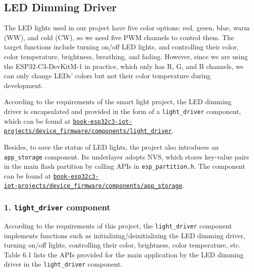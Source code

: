 \documentclass[a4paper,12pt]{book}
\begin{document}
\subsection{LED Dimming Driver}
The LED lights used in our project have five color options: red, green, blue, warm (WW), and cold (CW), so we need five PWM channels to control them. The target functions include turning on/off LED lights, and controlling their color, color temperature, brightness, breathing, and fading. However, since we are using the ESP32-C3-DevKitM-1 in practice, which only has R, G, and B channels, we can only change LEDs’ colors but not their color temperature during development.

According to the requirements of the smart light project, the LED dimming driver is encapsulated and provided in the form of a \verb|light_driver| component, which can be found at \href{https://github.com/espressif/book-esp32c3-iot-projects/tree/main/device_firmware/components/light_driver}{\texttt{book-esp32c3-iot-projects/device\_firmware/components/light\_driver}}.

Besides, to save the status of LED lights, the project also introduces an \verb|app_storage| component. Its underlayer adopts NVS, which stores key-value pairs in the main flash partition by calling APIs in \verb|esp_partition.h|. The component can be found at \href{https://github.com/espressif/book-esp32c3-iot-projects/tree/main/device_firmware/components/app_storage}{\texttt{book-esp32c3-\\ iot-projects/device\_firmware/components/app\_storage}}.

\subsubsection{1. \texttt{light\_driver} component}
According to the requirements of this project, the \verb|light_driver| component implements functions such as initializing/deinitializing the LED dimming driver, turning on/off lights, controlling their color, brightness, color temperature, etc. Table 6.1 lists the APIs provided for the main application by the LED dimming driver in the \verb|light_driver| component.
\end{document}
